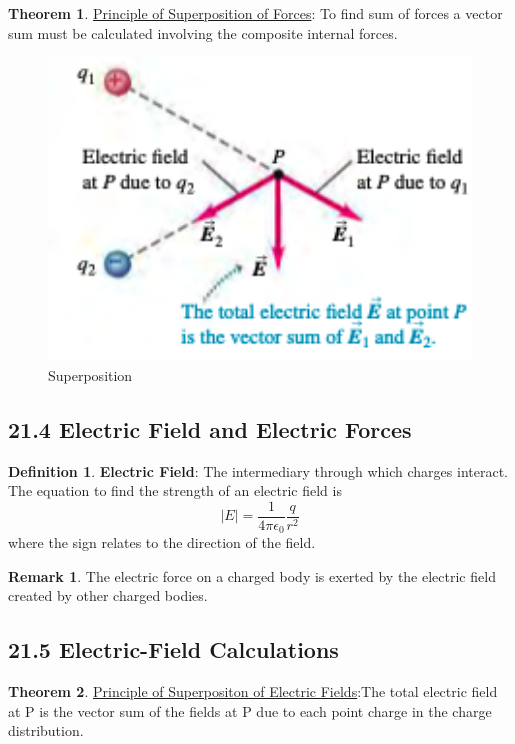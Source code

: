 \documentclass[12pt]{amsart}
\theoremstyle{definition}
\newtheorem{theorem}{Theorem}  %
\newtheorem{definition}{Definition} %
\newtheorem*{remark}{Remark}        %
\numberwithin{equation}{theorem}    %
\begin{document}
\begin{theorem}
    \underline{Principle of Superposition of Forces}: To find sum of forces a 
    vector sum must be calculated involving the composite internal forces.
\end{theorem}

\begin{figure}[H]
    \centering
    \includegraphics[width=5in]{Media/superposition.png}
    \caption{Superposition}
    \label{Superposition}
\end{figure}

\subsection*{21.4 Electric Field and Electric Forces}

\begin{definition}
    \textbf{Electric Field}:
    The intermediary through which charges interact. 
    The equation to find the strength of an electric field is $$|E| = \frac{1}{4\pi\epsilon_0}\frac{q}{r^2}$$
    where the sign relates to the direction of the field.
    \begin{remark}
        The electric force on a charged body is exerted by the electric field 
        created by other charged bodies.
    \end{remark}
\end{definition}

\subsection*{21.5 Electric-Field Calculations}

\begin{theorem}
    \underline{Principle of Superpositon of Electric Fields}:The total electric 
    field at P is the vector sum of the fields at P due to each point charge 
    in the charge distribution. 
\end{theorem}
\end{document}
